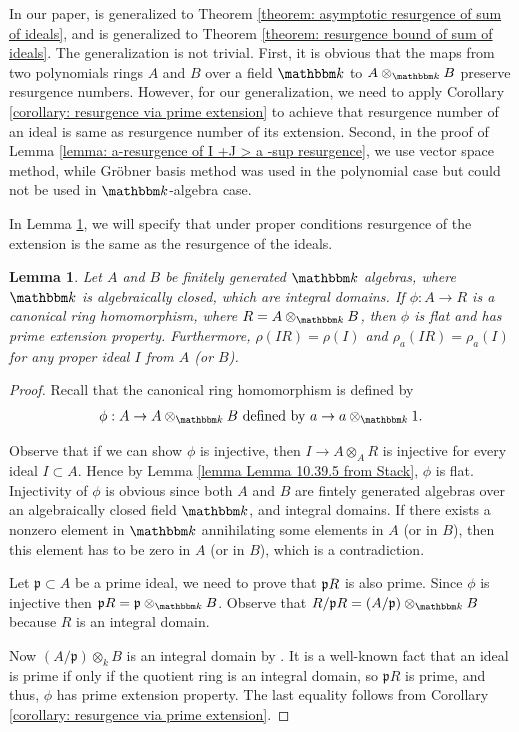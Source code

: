 \documentclass[12pt]{amsart}
\numberwithin{equation}{section}
\newtheorem{lemma}[theorem]{Lemma}
\theoremstyle{definition}
\newcommand{\kk}{{\mathbbm k}}
\def\pp{{\frak p}}
\begin{document}
In our paper, \cite[Theorem 2.6]{fiberprojective} is generalized to Theorem \ref{theorem: asymptotic resurgence of sum of ideals}, and \cite[Theorem 2.3]{sharpbound} is generalized to Theorem \ref{theorem: resurgence bound of sum of ideals}. The generalization is not trivial. First, it is obvious that the maps from two polynomials rings $A$ and $B$ over a field $\kk$ to $A \otimes_{\kk} B$ preserve resurgence numbers. However, for our generalization, we need to apply Corollary \ref{corollary: resurgence via prime extension} to achieve that resurgence number of an ideal is same as resurgence number of its extension. Second, in the proof of Lemma \ref{lemma: a-resurgence of  I +J > a -sup resurgence}, we use vector space method, while Gröbner basis method was used in the polynomial case but could not be used in $\kk$-algebra case.

In  Lemma \ref{lemma: flat and prime under tensor product}, we will specify that under proper conditions resurgence of the extension is the same as the resurgence of the ideals.


	
		\begin{lemma}\label{lemma: flat and prime under tensor product}
		Let $A$ and $B$ be finitely generated $\kk$ algebras, where $\kk$ is algebraically closed, which are integral domains. If  $\phi: A \to R$ is  a canonical ring homomorphism, where $R=A\otimes_{\kk} B$, then $\phi$ is {flat} and has {prime extension} property. Furthermore, $ \rho(IR) =\rho(I)$ and $\rho_a(IR)=\rho_a(I)$ for any proper ideal $I$ from $A$ (or $B$).
	\end{lemma}
	
	\begin{proof}
	Recall that the canonical ring homomorphism is defined by
	$$
			\phi : A \to A \otimes_\kk B \text{ defined by } a \rightarrow a \otimes_\kk 1. 
		$$
		
		Observe that if we can show $\phi$ is injective, then $I \rightarrow A \otimes_A R$ is injective for every ideal $I \subset A$. Hence by Lemma \ref{lemma Lemma 10.39.5 from Stack},  $\phi$ is {flat}. Injectivity of $\phi$ is obvious since both $A$ and $B$ are  fintely generated algebras over an algebraically closed field $\kk$, and {integral domains}. If there exists a nonzero element in $\kk$ annihilating some elements in $A$ (or in $B$), then this element has to be zero in $A$ (or in $B$), which is a contradiction.
		
		
		Let $\mathfrak{p} \subset A$ be a prime ideal, we need to prove that $\pp R$ is also prime. Since $\phi$ is injective then $\mathfrak{p}R = \mathfrak{p} \otimes_\kk B$. Observe that $ R / \mathfrak{p}R = \left(A / \mathfrak{p}\right) \otimes_\kk B$ because $R$ is an {integral domain}.  
		
  Now $\left(A / \mathfrak{p}\right) \otimes_k B$ is an integral domain	by \cite[Lemma 1.54]{algvar}. 
	 It is a well-known fact that an ideal is prime if only if the quotient ring is an integral domain, so $\mathfrak{p}R$ is prime, and thus, $\phi$ has {prime extension} property. The last equality follows from  Corollary \ref{corollary: resurgence via prime extension}. 
\end{proof}	
\end{document}
